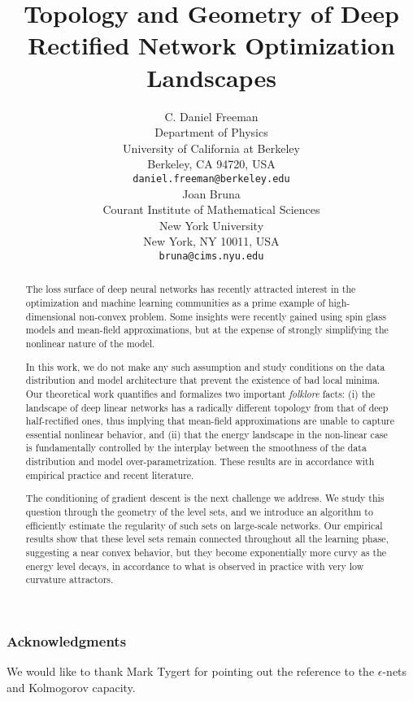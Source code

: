 \documentclass{article} %
\title{Topology and Geometry of Deep Rectified Network Optimization Landscapes }
\author{C. Daniel Freeman  \\
Department of Physics\\
University of California at Berkeley\\
Berkeley, CA 94720, USA \\
\texttt{daniel.freeman@berkeley.edu} \\
\And
Joan Bruna \\
Courant Institute of Mathematical Sciences \\
New York University \\
New York, NY 10011, USA \\
\texttt{bruna@cims.nyu.edu} \\
}
\begin{document}
\maketitle

\begin{abstract}
The loss surface of deep neural networks has recently attracted interest 
in the optimization and machine learning communities as a prime example of 
high-dimensional non-convex problem. Some insights were recently gained using spin glass 
models and mean-field approximations, but at the expense of strongly simplifying the nonlinear nature of the model.

In this work, we do not make any such assumption and study conditions 
on the data distribution and model architecture that prevent the existence 
of bad local minima. Our theoretical work quantifies and formalizes two 
important \emph{folklore} facts: (i) the landscape of deep linear networks has a radically different topology 
from that of deep half-rectified ones, thus implying that mean-field approximations
are unable to capture essential nonlinear behavior, and (ii) that the energy landscape 
in the non-linear case is fundamentally controlled by the interplay between the smoothness of the data distribution and model over-parametrization. 
These results are in accordance with empirical practice and recent literature. 

The conditioning of gradient descent is the next challenge we address. 
We study this question through the geometry of the level sets, and we introduce
an algorithm to efficiently estimate the regularity of such sets on large-scale networks. 
Our empirical results show that these level sets remain connected throughout 
all the learning phase, suggesting a near convex behavior, but they become 
exponentially more curvy as the energy level decays, in accordance to what is observed in practice with 
very low curvature attractors.
\end{abstract}









  



\subsubsection*{Acknowledgments}

We would like to thank Mark Tygert for pointing out 
the reference to the $\epsilon$-nets and Kolmogorov capacity.
 




\appendix



\end{document}
